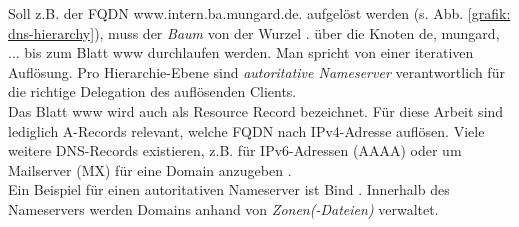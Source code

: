 Soll z.B. der FQDN www.intern.ba.mungard.de. aufgelöst werden (s. Abb. \ref{grafik: dns-hierarchy}), muss der \textit{Baum} von der Wurzel \glqq .\grqq{} über die Knoten \glqq de\grqq{}, \glqq mungard\grqq{}, ... bis zum Blatt \glqq www\grqq{} durchlaufen werden. Man spricht von einer iterativen Auflösung. Pro Hierarchie-Ebene sind \textit{autoritative Nameserver} verantwortlich für die richtige Delegation des auflösenden Clients.\\
Das Blatt \glqq www\grqq{} wird auch als Resource Record bezeichnet. Für diese Arbeit sind lediglich A-Records relevant, welche FQDN nach IPv4-Adresse auflösen. Viele weitere DNS-Records existieren, z.B. für IPv6-Adressen (AAAA) oder um Mailserver (MX) für eine Domain anzugeben \cite[S.528]{Fall2011}.\\
Ein Beispiel für einen autoritativen Nameserver ist Bind \cite{liu2006dns}. Innerhalb des Nameservers werden Domains anhand von \textit{Zonen(-Dateien)} verwaltet.
\newpage
